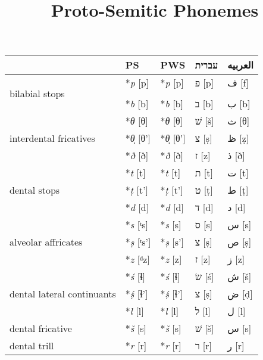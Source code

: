 \documentclass{article}
\title{Proto-Semitic Phonemes}
\begin{document}
\begin{tabular}{@{}lllll@{}}
  \toprule
  & PS                  & PWS                 & \texthebrew{עברית} & \textarabic{العربيه} \\
  \midrule
  \multirow{3}{*}{bilabial stops}
  & \**\textit{p} [p]   & \**\textit{p} [p]   & \texthebrew{פ} [p] & \textarabic{ف} [f]\\
  \\
  & \**\textit{b} [b]   & \**\textit{b} [b]   & \texthebrew{ב} [b] & \textarabic{ب} [b] \\
  \midrule
  \multirow{3}{*}{interdental fricatives}
  & \**\textit{θ} [θ]   & \**\textit{θ} [θ]   & \texthebrew{שׁ} [š] & \textarabic{ث} [θ]\\
  & \**\textit{θ̣} [θ']  & \**\textit{θ̣} [θ']  & \texthebrew{צ} [ṣ] & \textarabic{ظ} [ẓ]\\
  & \**\textit{ð} [ð]   & \**\textit{ð} [ð]   & \texthebrew{ז} [z] & \textarabic{ذ} [ð] \\
  \midrule
  \multirow{3}{*}{dental stops}
  & \**\textit{t} [t]   & \**\textit{t} [t]   & \texthebrew{ת} [t] & \textarabic{ت} [t]\\
  & \**\textit{ṭ} [t']  & \**\textit{ṭ} [t']  & \texthebrew{ט} [ṭ] & \textarabic{ط} [ṭ]\\
  & \**\textit{d} [d]   & \**\textit{d} [d]   & \texthebrew{ד} [d] & \textarabic{د} [d] \\
  \midrule
  \multirow{3}{*}{alveolar affricates}
  & \**\textit{s} [ᵗs]  & \**\textit{s} [s]  & \texthebrew{ס} [s] & \textarabic{س} [s]\\
  & \**\textit{ṣ} [ᵗs'] & \**\textit{ṣ} [s'] & \texthebrew{צ} [ṣ] & \textarabic{ص} [ṣ]\\
  & \**\textit{z} [ᵈz]  & \**\textit{z} [z]  & \texthebrew{ז} [z] & \textarabic{ز} [z]\\
  \midrule
  \multirow{3}{*}{dental lateral continuants}
  & \**\textit{ś} [ɬ]   & \**\textit{ś} [ɬ]   & \texthebrew{שׂ} [ś] & \textarabic{ش} [š]\\
  & \**\textit{ṣ́} [ɬ']  & \**\textit{ṣ́} [ɬ']  & \texthebrew{צ} [ṣ] & \textarabic{ض} [ḍ]\\
  & \**\textit{l} [l]   & \**\textit{l} [l]   & \texthebrew{ל} [l] & \textarabic{ل} [l]\\
  \midrule
  dental fricative
  & \**\textit{š} [s]   & \**\textit{š} [s]   & \texthebrew{שׁ} [š] & \textarabic{س} [s]\\
  \midrule
  dental trill
  & \**\textit{r} [r]   & \**\textit{r} [r]   & \texthebrew{ר} [r] & \textarabic{ر} [r]\\

\end{tabular}
\end{document}
